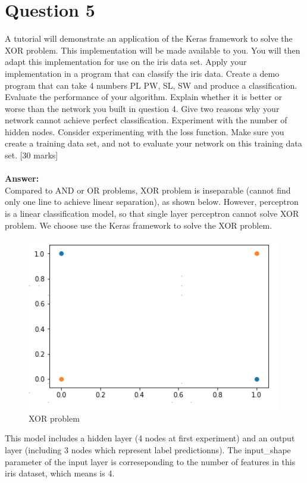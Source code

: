 \documentclass{article}
\begin{document}
\section{Question 5}
A tutorial will demonstrate an application of the Keras framework to solve the XOR problem. This implementation will be made available to you. You will then adapt this implementation for use on the iris data set.
Apply your implementation in a program that can classify the iris data. Create a demo program that can take 4 numbers PL PW, SL, SW and produce a classification. Evaluate the performance of your algorithm. Explain whether it is better or worse than the network you built in question 4. Give two reasons why your network cannot achieve perfect classification.
Experiment with the number of hidden nodes. Consider experimenting with the loss function. Make sure you create a training data set, and not to evaluate your network on this training data set.
[30 marks]\\\\
\textbf{Answer:}\\
Compared to AND or OR problems, XOR problem is inseparable (cannot find only one line to achieve linear separation), as shown below. However, perceptron is a linear classification model, so that single layer perceptron cannot solve XOR problem. We choose use the Keras framework to solve the XOR problem.
\begin{figure}[H]
\centering
\includegraphics[scale=0.4]{XOR.png}
\caption{XOR problem}
\end{figure}
\noindent
This model includes a hidden layer (4 nodes at first experiment) and an output layer (including 3 nodes which represent label predictionns). The input\_shape parameter of the input layer is correseponding to the number of features in this iris dataset, which means is 4.\\
\end{document}
